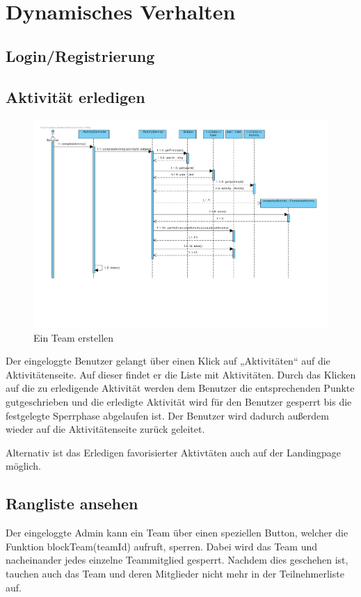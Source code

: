 ﻿\section{Dynamisches Verhalten}

\subsection{Login/Registrierung}
\subsection{Aktivität erledigen}

\begin{figure}[H]
  \centering
  \includegraphics[width=\textwidth, clip]{gfx/aktivitaet_erledigen}
  \caption{Ein Team erstellen}
\end{figure}

Der eingeloggte Benutzer gelangt über einen Klick auf „Aktivitäten“
auf die Aktivitätenseite. Auf dieser findet er die Liste mit
Aktivitäten. Durch das Klicken auf die zu erledigende Aktivität werden
dem Benutzer die entsprechenden Punkte gutgeschrieben und die
erledigte Aktivität wird für den Benutzer gesperrt bis die festgelegte
Sperrphase abgelaufen ist. Der Benutzer wird dadurch außerdem wieder auf die
Aktivitätenseite zurück geleitet.

Alternativ ist das Erledigen favorisierter Aktivtäten auch auf der
Landingpage möglich.

\subsection{Rangliste ansehen}
Der eingeloggte Admin kann ein Team über einen speziellen Button, welcher die Funktion blockTeam(teamId) aufruft, sperren. Dabei wird das Team und nacheinander jedes einzelne Teammitglied gesperrt. Nachdem dies geschehen ist, tauchen auch das Team und deren Mitglieder nicht mehr in der Teilnehmerliste auf.\\

